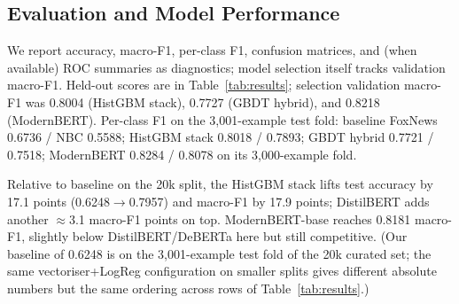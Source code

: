 \documentclass[10pt]{article}
\begin{document}
\subsection{Evaluation and Model Performance}
We report accuracy, macro-F1, per-class F1, confusion matrices, and (when available) ROC summaries as diagnostics; model selection itself tracks validation macro-F1. Held-out scores are in Table~\ref{tab:results}; selection validation macro-F1 was 0.8004 (HistGBM stack), 0.7727 (GBDT hybrid), and 0.8218 (ModernBERT). Per-class F1 on the 3{,}001-example test fold: baseline FoxNews 0.6736 / NBC 0.5588; HistGBM stack 0.8018 / 0.7893; GBDT hybrid 0.7721 / 0.7518; ModernBERT 0.8284 / 0.8078 on its 3{,}000-example fold.

Relative to baseline on the 20k split, the HistGBM stack lifts test accuracy by 17.1 points (0.6248$\to$0.7957) and macro-F1 by 17.9 points; DistilBERT adds another $\approx$3.1 macro-F1 points on top. ModernBERT-base reaches 0.8181 macro-F1, slightly below DistilBERT/DeBERTa here but still competitive. (Our baseline of 0.6248 is on the 3{,}001-example test fold of the 20k curated set; the same vectoriser+LogReg configuration on smaller splits gives different absolute numbers but the same ordering across rows of Table~\ref{tab:results}.)
\end{document}
